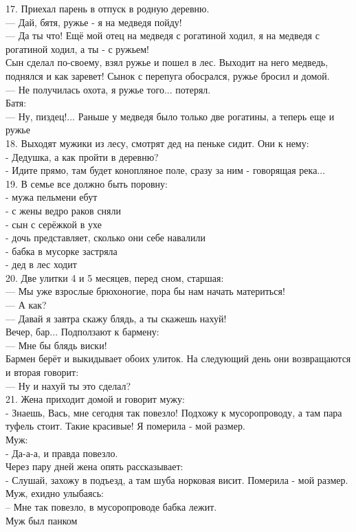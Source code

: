 \documentclass[a4paper,20pt,notitlepage]{extbook}
\begin{document}
	17. Приехал парень в отпуск в родную деревню.\\
	— Дай, бятя, ружье - я на медведя пойду!\\
	— Да ты что! Ещё мой отец на медведя с рогатиной ходил, я на медведя с рогатиной ходил, а ты - с ружьем!\\
	Сын сделал по-своему, взял ружье и пошел в лес.
	 Выходит на него медведь, поднялся и как заревет! Сынок с перепуга обосрался, ружье бросил и домой.\\
	— Не получилась охота, я ружье того... потерял.\\
	Батя:\\
	
	— Ну, пиздец!... Раньше у медведя было только две рогатины, а теперь еще и ружье\\
	
	18. Выходят мужики из лесу, смотрят дед на пеньке сидит.
	Они к нему:\\
	- Дедушка, а как пройти в деревню?\\
	- Идите прямо, там будет конопляное поле, сразу за ним - говорящая река...\\
	
	19. В семье все должно быть поровну:\\
	- мужа пельмени ебут\\
	- с жены ведро раков сняли\\
	- сын с серёжкой в ухе\\
	- дочь представляет, сколько они себе навалили\\
	- бабка в мусорке застряла\\
	- дед в лес ходит\\
	
	20. Две улитки 4 и 5 месяцев, перед сном, старшая:\\
	— Мы уже взрослые брюхоногие, пора бы нам начать материться!\\
	— А как?\\
	— Давай я завтра скажу блядь, а ты скажешь нахуй!\\
	Вечер, бар... Подползают к бармену:\\
	— Мне бы блядь виски!\\
	Бармен берёт и выкидывает обоих улиток. На следующий день они возвращаются и вторая говорит:\\
	— Ну и нахуй ты это сделал?\\
	
	21. Жена приходит домой и говорит мужу:\\
	- Знаешь, Вась, мне сегодня так повезло! Подхожу к мусоропроводу, а там пара туфель стоит. Такие красивые! Я померила - мой размер.\\
	Муж:\\
	- Да-а-а, и правда повезло.\\
	Через пару дней жена опять рассказывает:\\
	- Слушай, захожу в подъезд, а там шуба норковая висит. Померила - мой размер.\\
	Муж, ехидно улыбаясь:\\
	– Мне так повезло, в мусоропроводе бабка лежит.\\
	Муж был панком\\
	
\end{document}
